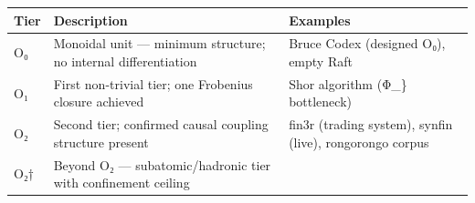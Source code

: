 \documentclass[12pt,a4paper]{article}
\begin{document}
\begin{longtable}[]{@{}lll@{}}
\toprule
\begin{minipage}[b]{0.20\columnwidth}\raggedright
Tier\strut
\end{minipage} & \begin{minipage}[b]{0.42\columnwidth}\raggedright
Description\strut
\end{minipage} & \begin{minipage}[b]{0.29\columnwidth}\raggedright
Examples\strut
\end{minipage}\tabularnewline
\midrule
\endhead
\begin{minipage}[t]{0.20\columnwidth}\raggedright
O₀\strut
\end{minipage} & \begin{minipage}[t]{0.42\columnwidth}\raggedright
Monoidal unit --- minimum structure; no internal differentiation\strut
\end{minipage} & \begin{minipage}[t]{0.29\columnwidth}\raggedright
Bruce Codex (designed O₀), empty Raft\strut
\end{minipage}\tabularnewline
\begin{minipage}[t]{0.20\columnwidth}\raggedright
O₁\strut
\end{minipage} & \begin{minipage}[t]{0.42\columnwidth}\raggedright
First non-trivial tier; one Frobenius closure achieved\strut
\end{minipage} & \begin{minipage}[t]{0.29\columnwidth}\raggedright
Shor algorithm (Φ\_\} bottleneck)\strut
\end{minipage}\tabularnewline
\begin{minipage}[t]{0.20\columnwidth}\raggedright
O₂\strut
\end{minipage} & \begin{minipage}[t]{0.42\columnwidth}\raggedright
Second tier; confirmed causal coupling structure present\strut
\end{minipage} & \begin{minipage}[t]{0.29\columnwidth}\raggedright
fin3r (trading system), synfin (live), rongorongo corpus\strut
\end{minipage}\tabularnewline
\begin{minipage}[t]{0.20\columnwidth}\raggedright
O₂†\strut
\end{minipage} & \begin{minipage}[t]{0.42\columnwidth}\raggedright
Beyond O₂ --- subatomic/hadronic tier with confinement ceiling\strut

\end{minipage}
\end{longtable}
\end{document}
